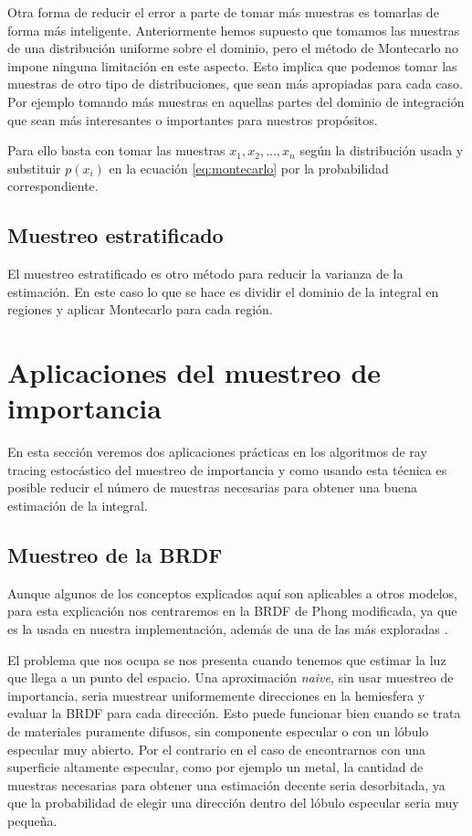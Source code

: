 Otra forma de reducir el error a parte de tomar más muestras es tomarlas de forma más inteligente. Anteriormente hemos supuesto que tomamos las muestras de una distribución uniforme sobre el dominio, pero el método de Montecarlo no impone ninguna limitación en este aspecto. Esto implica que podemos tomar las muestras de otro tipo de distribuciones, que sean más apropiadas para cada caso. Por ejemplo tomando más muestras en aquellas partes del dominio de integración que sean más interesantes o importantes para nuestros propósitos.

\medskip

Para ello basta con tomar las muestras $x_1, x_2, ..., x_n$ según la distribución usada y substituir $p(x_i)$ en la ecuación \ref{eq:montecarlo} por la probabilidad correspondiente.

\subsection{Muestreo estratificado}

El muestreo estratificado es otro método para reducir la varianza de la estimación. En este caso lo que se hace es dividir el dominio de la integral en regiones y aplicar Montecarlo para cada región. 

\clearpage

\section{Aplicaciones del muestreo de importancia}

En esta sección veremos dos aplicaciones prácticas en los algoritmos de ray tracing estocástico del muestreo de importancia y como usando esta técnica es posible reducir el número de muestras necesarias para obtener una buena estimación de la integral.


\subsection{Muestreo de la BRDF}
\label{muestreo_brdf}
Aunque algunos de los conceptos explicados aquí son aplicables a otros modelos, para esta explicación nos centraremos en la BRDF de Phong modificada, ya que es la usada en nuestra implementación, además de una de las más exploradas \cite{Lafortune1994}.



\medskip

El problema que nos ocupa se nos presenta cuando tenemos que estimar la luz que llega a un punto del espacio. Una aproximación \emph{naive}, sin usar muestreo de importancia, seria muestrear uniformemente direcciones en la hemiesfera y evaluar la BRDF para cada dirección. Esto puede funcionar bien cuando se trata de materiales puramente difusos, sin componente especular o con un lóbulo especular muy abierto. Por el contrario en el caso de encontrarnos con una superficie altamente especular, como por ejemplo un metal, la cantidad de muestras necesarias para obtener una estimación decente seria desorbitada, ya que la probabilidad de elegir una dirección dentro del lóbulo especular seria muy pequeña.

